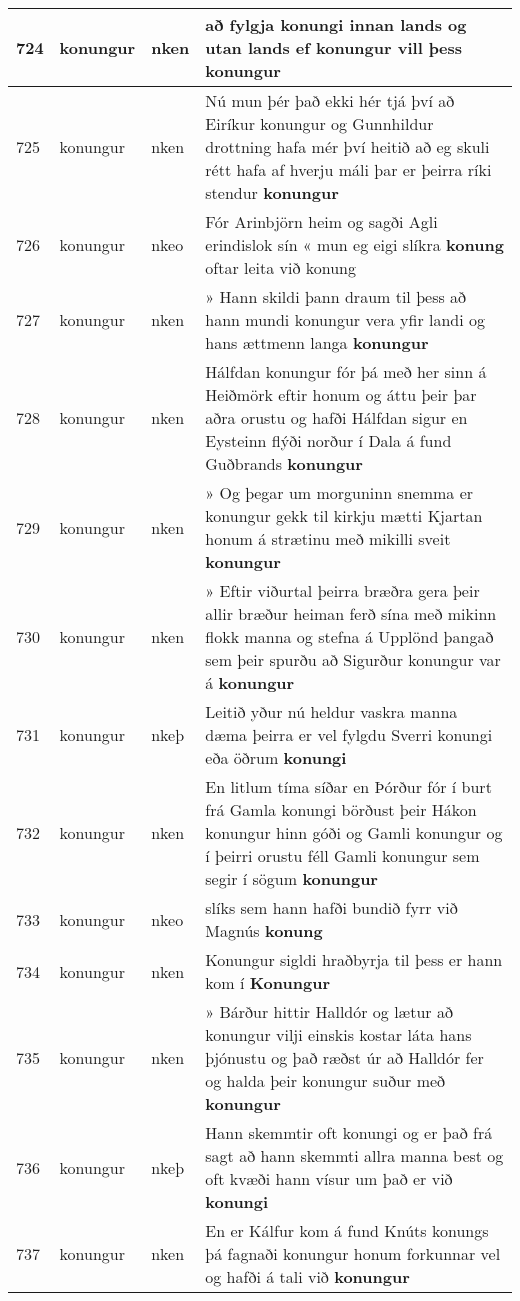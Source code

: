 \documentclass{article}
\begin{document}
\begin{longtable}{p{1cm}|p{1cm}|p{1cm}|p{13cm}}
\hline
724&konungur&nken&að fylgja konungi innan lands og utan lands ef konungur vill þess \textbf{konungur} \\
\hline
725&konungur&nken&Nú mun þér það ekki hér tjá því að Eiríkur konungur og Gunnhildur drottning hafa mér því heitið að eg skuli rétt hafa af hverju máli þar er þeirra ríki stendur \textbf{konungur} \\
\hline
726&konungur&nkeo&Fór Arinbjörn heim og sagði Agli erindislok sín « mun eg eigi slíkra \textbf{konung} oftar leita við konung\\
\hline
727&konungur&nken&» Hann skildi þann draum til þess að hann mundi konungur vera yfir landi og hans ættmenn langa \textbf{konungur} \\
\hline
728&konungur&nken&Hálfdan konungur fór þá með her sinn á Heiðmörk eftir honum og áttu þeir þar aðra orustu og hafði Hálfdan sigur en Eysteinn flýði norður í Dala á fund Guðbrands \textbf{konungur} \\
\hline
729&konungur&nken&» Og þegar um morguninn snemma er konungur gekk til kirkju mætti Kjartan honum á strætinu með mikilli sveit \textbf{konungur} \\
\hline
730&konungur&nken&» Eftir viðurtal þeirra bræðra gera þeir allir bræður heiman ferð sína með mikinn flokk manna og stefna á Upplönd þangað sem þeir spurðu að Sigurður konungur var á \textbf{konungur} \\
\hline
731&konungur&nkeþ&Leitið yður nú heldur vaskra manna dæma þeirra er vel fylgdu Sverri konungi eða öðrum \textbf{konungi} \\
\hline
732&konungur&nken&En litlum tíma síðar en Þórður fór í burt frá Gamla konungi börðust þeir Hákon konungur hinn góði og Gamli konungur og í þeirri orustu féll Gamli konungur sem segir í sögum \textbf{konungur} \\
\hline
733&konungur&nkeo&slíks sem hann hafði bundið fyrr við Magnús \textbf{konung} \\
\hline
734&konungur&nken&Konungur sigldi hraðbyrja til þess er hann kom í \textbf{Konungur} \\
\hline
735&konungur&nken&» Bárður hittir Halldór og lætur að konungur vilji einskis kostar láta hans þjónustu og það ræðst úr að Halldór fer og halda þeir konungur suður með \textbf{konungur} \\
\hline
736&konungur&nkeþ&Hann skemmtir oft konungi og er það frá sagt að hann skemmti allra manna best og oft kvæði hann vísur um það er við \textbf{konungi} \\
\hline
737&konungur&nken&En er Kálfur kom á fund Knúts konungs þá fagnaði konungur honum forkunnar vel og hafði á tali við \textbf{konungur} \\

\end{longtable}
\end{document}
